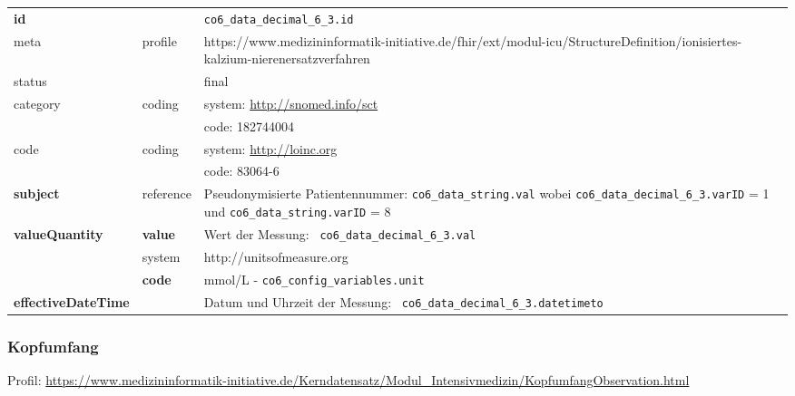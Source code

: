 \begin{longtable}{|l|l|p{7.5cm}|}
        \hline
        \rowcolor{lightgray} \multicolumn{3}{|l|}{Data Mapping (inhaltlich)} \\ \hline
        \textbf{id} &  & \texttt{co6\_data\_decimal\_6\_3.id} \\ \hline
	meta & profile & https://www.medizininformatik-initiative.de/fhir/ext/modul-icu/StructureDefinition/ionisiertes-kalzium-nierenersatzverfahren \\ \hline 
	status &  & final   \\ \hline 
	category & coding & system: \url{http://snomed.info/sct} \\
\cline{3-3}
	& & code: 182744004 \\ \hline
	code & coding & system: \url{http://loinc.org} \\ 
	\cline{3-3} 
	 &  & code: 83064-6 \\ \hline
	 \textbf{subject} & reference & Pseudonymisierte Patientennummer: \texttt{co6\_data\_string.val} wobei \texttt{co6\_data\_decimal\_6\_3.varID} = 1 und \texttt{co6\_data\_string.varID} = 8 \\ \hline
	 \textbf{valueQuantity}  & \textbf{value} & Wert der Messung: \texttt{
co6\_data\_decimal\_6\_3.val} \\
        \cline{2-3}
         & system & http://unitsofmeasure.org \\
         \cline{2-3}
         & \textbf{code} & mmol/L - \texttt{co6\_config\_variables.unit} \\ \hline
     \textbf{effectiveDateTime}  & & Datum und Uhrzeit der Messung: \texttt{
co6\_data\_decimal\_6\_3.datetimeto} \\ \hline
\end{longtable}

\subsubsection{Kopfumfang} 

Profil: \url{https://www.medizininformatik-initiative.de/Kerndatensatz/Modul_Intensivmedizin/KopfumfangObservation.html}

